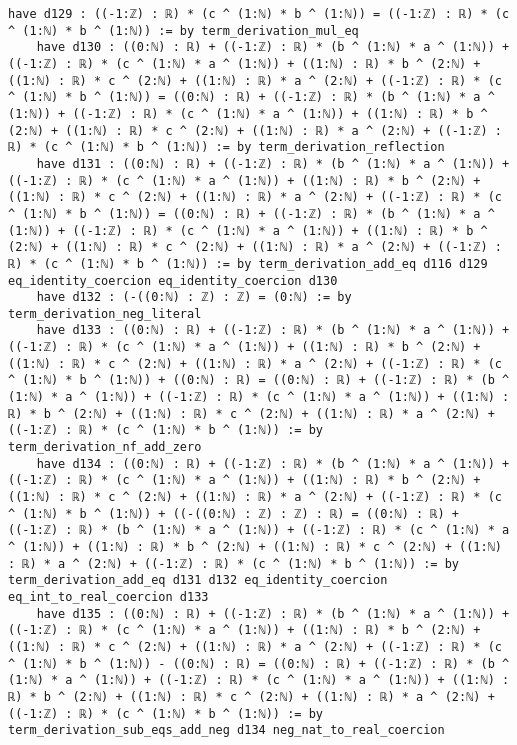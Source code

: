 \documentclass{article}
\begin{document}
\begin{tcolorbox}[colback=white!10, width=\linewidth]
\begin{lstlisting}[language=Lean4]
    have d129 : ((-1:ℤ) : ℝ) * (c ^ (1:ℕ) * b ^ (1:ℕ)) = ((-1:ℤ) : ℝ) * (c ^ (1:ℕ) * b ^ (1:ℕ)) := by term_derivation_mul_eq
    have d130 : ((0:ℕ) : ℝ) + ((-1:ℤ) : ℝ) * (b ^ (1:ℕ) * a ^ (1:ℕ)) + ((-1:ℤ) : ℝ) * (c ^ (1:ℕ) * a ^ (1:ℕ)) + ((1:ℕ) : ℝ) * b ^ (2:ℕ) + ((1:ℕ) : ℝ) * c ^ (2:ℕ) + ((1:ℕ) : ℝ) * a ^ (2:ℕ) + ((-1:ℤ) : ℝ) * (c ^ (1:ℕ) * b ^ (1:ℕ)) = ((0:ℕ) : ℝ) + ((-1:ℤ) : ℝ) * (b ^ (1:ℕ) * a ^ (1:ℕ)) + ((-1:ℤ) : ℝ) * (c ^ (1:ℕ) * a ^ (1:ℕ)) + ((1:ℕ) : ℝ) * b ^ (2:ℕ) + ((1:ℕ) : ℝ) * c ^ (2:ℕ) + ((1:ℕ) : ℝ) * a ^ (2:ℕ) + ((-1:ℤ) : ℝ) * (c ^ (1:ℕ) * b ^ (1:ℕ)) := by term_derivation_reflection
    have d131 : ((0:ℕ) : ℝ) + ((-1:ℤ) : ℝ) * (b ^ (1:ℕ) * a ^ (1:ℕ)) + ((-1:ℤ) : ℝ) * (c ^ (1:ℕ) * a ^ (1:ℕ)) + ((1:ℕ) : ℝ) * b ^ (2:ℕ) + ((1:ℕ) : ℝ) * c ^ (2:ℕ) + ((1:ℕ) : ℝ) * a ^ (2:ℕ) + ((-1:ℤ) : ℝ) * (c ^ (1:ℕ) * b ^ (1:ℕ)) = ((0:ℕ) : ℝ) + ((-1:ℤ) : ℝ) * (b ^ (1:ℕ) * a ^ (1:ℕ)) + ((-1:ℤ) : ℝ) * (c ^ (1:ℕ) * a ^ (1:ℕ)) + ((1:ℕ) : ℝ) * b ^ (2:ℕ) + ((1:ℕ) : ℝ) * c ^ (2:ℕ) + ((1:ℕ) : ℝ) * a ^ (2:ℕ) + ((-1:ℤ) : ℝ) * (c ^ (1:ℕ) * b ^ (1:ℕ)) := by term_derivation_add_eq d116 d129 eq_identity_coercion eq_identity_coercion d130
    have d132 : (-((0:ℕ) : ℤ) : ℤ) = (0:ℕ) := by term_derivation_neg_literal
    have d133 : ((0:ℕ) : ℝ) + ((-1:ℤ) : ℝ) * (b ^ (1:ℕ) * a ^ (1:ℕ)) + ((-1:ℤ) : ℝ) * (c ^ (1:ℕ) * a ^ (1:ℕ)) + ((1:ℕ) : ℝ) * b ^ (2:ℕ) + ((1:ℕ) : ℝ) * c ^ (2:ℕ) + ((1:ℕ) : ℝ) * a ^ (2:ℕ) + ((-1:ℤ) : ℝ) * (c ^ (1:ℕ) * b ^ (1:ℕ)) + ((0:ℕ) : ℝ) = ((0:ℕ) : ℝ) + ((-1:ℤ) : ℝ) * (b ^ (1:ℕ) * a ^ (1:ℕ)) + ((-1:ℤ) : ℝ) * (c ^ (1:ℕ) * a ^ (1:ℕ)) + ((1:ℕ) : ℝ) * b ^ (2:ℕ) + ((1:ℕ) : ℝ) * c ^ (2:ℕ) + ((1:ℕ) : ℝ) * a ^ (2:ℕ) + ((-1:ℤ) : ℝ) * (c ^ (1:ℕ) * b ^ (1:ℕ)) := by term_derivation_nf_add_zero
    have d134 : ((0:ℕ) : ℝ) + ((-1:ℤ) : ℝ) * (b ^ (1:ℕ) * a ^ (1:ℕ)) + ((-1:ℤ) : ℝ) * (c ^ (1:ℕ) * a ^ (1:ℕ)) + ((1:ℕ) : ℝ) * b ^ (2:ℕ) + ((1:ℕ) : ℝ) * c ^ (2:ℕ) + ((1:ℕ) : ℝ) * a ^ (2:ℕ) + ((-1:ℤ) : ℝ) * (c ^ (1:ℕ) * b ^ (1:ℕ)) + ((-((0:ℕ) : ℤ) : ℤ) : ℝ) = ((0:ℕ) : ℝ) + ((-1:ℤ) : ℝ) * (b ^ (1:ℕ) * a ^ (1:ℕ)) + ((-1:ℤ) : ℝ) * (c ^ (1:ℕ) * a ^ (1:ℕ)) + ((1:ℕ) : ℝ) * b ^ (2:ℕ) + ((1:ℕ) : ℝ) * c ^ (2:ℕ) + ((1:ℕ) : ℝ) * a ^ (2:ℕ) + ((-1:ℤ) : ℝ) * (c ^ (1:ℕ) * b ^ (1:ℕ)) := by term_derivation_add_eq d131 d132 eq_identity_coercion eq_int_to_real_coercion d133
    have d135 : ((0:ℕ) : ℝ) + ((-1:ℤ) : ℝ) * (b ^ (1:ℕ) * a ^ (1:ℕ)) + ((-1:ℤ) : ℝ) * (c ^ (1:ℕ) * a ^ (1:ℕ)) + ((1:ℕ) : ℝ) * b ^ (2:ℕ) + ((1:ℕ) : ℝ) * c ^ (2:ℕ) + ((1:ℕ) : ℝ) * a ^ (2:ℕ) + ((-1:ℤ) : ℝ) * (c ^ (1:ℕ) * b ^ (1:ℕ)) - ((0:ℕ) : ℝ) = ((0:ℕ) : ℝ) + ((-1:ℤ) : ℝ) * (b ^ (1:ℕ) * a ^ (1:ℕ)) + ((-1:ℤ) : ℝ) * (c ^ (1:ℕ) * a ^ (1:ℕ)) + ((1:ℕ) : ℝ) * b ^ (2:ℕ) + ((1:ℕ) : ℝ) * c ^ (2:ℕ) + ((1:ℕ) : ℝ) * a ^ (2:ℕ) + ((-1:ℤ) : ℝ) * (c ^ (1:ℕ) * b ^ (1:ℕ)) := by term_derivation_sub_eqs_add_neg d134 neg_nat_to_real_coercion

\end{lstlisting}
\end{tcolorbox}
\end{document}
